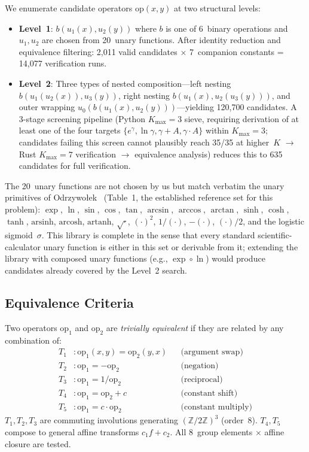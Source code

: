 \documentclass[10pt,twocolumn]{article}
\theoremstyle{remark}
\begin{document}
We enumerate candidate operators $\mathrm{op}(x,y)$ at two structural levels:

\begin{itemize}
\item \textbf{Level~1}: $b(u_1(x), u_2(y))$ where $b$ is one of 6~binary operations and $u_1, u_2$ are chosen from 20~unary functions. After identity reduction and equivalence filtering: 2{,}011 valid candidates $\times$ 7~companion constants = 14{,}077 verification runs.
\item \textbf{Level~2}: Three types of nested composition---left nesting $b(u_1(u_2(x)), u_3(y))$, right nesting $b(u_1(x), u_2(u_3(y)))$, and outer wrapping $u_0(b(u_1(x), u_2(y)))$---yielding 120{,}700 candidates. A 3-stage screening pipeline (Python $K_{\max}{=}3$ sieve, requiring derivation of at least one of the four targets $\{e^{\gamma}, \ln\gamma, \gamma{+}A, \gamma{\cdot}A\}$ within $K_{\max}{=}3$; candidates failing this screen cannot plausibly reach 35/35 at higher~$K$ $\to$ Rust $K_{\max}{=}7$ verification $\to$ equivalence analysis) reduces this to 635 candidates for full verification.
\end{itemize}

The 20~unary functions are not chosen by us but match verbatim the unary primitives of Odrzywołek~\cite{odrzywołek2026} (Table~1, the established reference set for this problem): $\exp$, $\ln$, $\sin$, $\cos$, $\tan$, $\arcsin$, $\arccos$, $\arctan$, $\sinh$, $\cosh$, $\tanh$, $\mathrm{arsinh}$, $\mathrm{arcosh}$, $\mathrm{artanh}$, $\sqrt{\cdot}$, $(\cdot)^2$, $1/(\cdot)$, $-(\cdot)$, $(\cdot)/2$, and the logistic sigmoid~$\sigma$. This library is complete in the sense that every standard scientific-calculator unary function is either in this set or derivable from it; extending the library with composed unary functions (e.g., $\exp \circ \ln$) would produce candidates already covered by the Level~2 search.

\subsection{Equivalence Criteria}

Two operators $\mathrm{op}_1$ and $\mathrm{op}_2$ are \emph{trivially equivalent} if they are related by any combination of:
\begin{align*}
T_1&: \mathrm{op}_1(x,y) = \mathrm{op}_2(y,x) && \text{(argument swap)}\\
T_2&: \mathrm{op}_1 = -\mathrm{op}_2 && \text{(negation)}\\
T_3&: \mathrm{op}_1 = 1/\mathrm{op}_2 && \text{(reciprocal)}\\
T_4&: \mathrm{op}_1 = \mathrm{op}_2 + c && \text{(constant shift)}\\
T_5&: \mathrm{op}_1 = c \cdot \mathrm{op}_2 && \text{(constant multiply)}
\end{align*}
$T_1, T_2, T_3$ are commuting involutions generating $(\mathbb{Z}/2\mathbb{Z})^3$ (order~8). $T_4, T_5$ compose to general affine transforms $c_1 f + c_2$. All 8~group elements $\times$ affine closure are tested.
\end{document}
